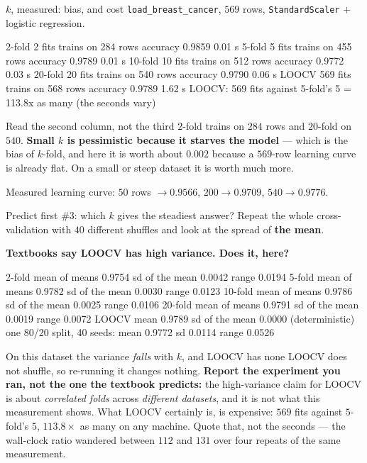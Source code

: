 \documentclass[aspectratio=169]{beamer}
\begin{document}
\begin{frame}[fragile,shrink=8]{$k$, measured: bias, and cost}
\texttt{load\_breast\_cancer}, $569$ rows, \texttt{StandardScaler} $+$
logistic regression.
\begin{outblk}
   2-fold      2 fits   trains on 284 rows   accuracy 0.9859     0.01 s
   5-fold      5 fits   trains on 455 rows   accuracy 0.9789     0.01 s
   10-fold    10 fits   trains on 512 rows   accuracy 0.9772     0.03 s
   20-fold    20 fits   trains on 540 rows   accuracy 0.9790     0.06 s
   LOOCV     569 fits   trains on 568 rows   accuracy 0.9789     1.62 s
   LOOCV: 569 fits against 5-fold's 5 = 113.8x as many (the seconds vary)
\end{outblk}
\begin{alertblock}{Read the second column, not the third}
  \footnotesize $2$-fold trains on $284$ rows and $20$-fold on $540$.
  \textbf{Small $k$ is pessimistic because it starves the model} --- which is
  the bias of $k$-fold, and here it is worth about $0.002$ because a
  $569$-row learning curve is already flat. On a small or steep dataset it is
  worth much more.
\end{alertblock}
\begin{center}\small
  Measured learning curve: $50$ rows $\to 0.9566$, $200 \to 0.9709$,
  $540 \to 0.9776$.
\end{center}
\end{frame}

\begin{frame}[fragile,shrink=8]{Predict first \#3: which $k$ gives the steadiest answer?}
Repeat the whole cross-validation with $40$ different shuffles and look at the
spread of \textbf{the mean}.

\begin{center}
  \textbf{Textbooks say LOOCV has high variance. Does it, here?}
\end{center}
\begin{outblk}
    2-fold   mean of means 0.9754   sd of the mean 0.0042   range 0.0194
    5-fold   mean of means 0.9782   sd of the mean 0.0030   range 0.0123
   10-fold   mean of means 0.9786   sd of the mean 0.0025   range 0.0106
   20-fold   mean of means 0.9791   sd of the mean 0.0019   range 0.0072
   LOOCV     mean          0.9789   sd of the mean 0.0000   (deterministic)
   one 80/20 split, 40 seeds: mean 0.9772  sd 0.0114  range 0.0526
\end{outblk}
\begin{alertblock}{On this dataset the variance \emph{falls} with $k$, and
  LOOCV has none}
  \footnotesize LOOCV does not shuffle, so re-running it changes nothing.
  \textbf{Report the experiment you ran, not the one the textbook predicts:}
  the high-variance claim for LOOCV is about \emph{correlated folds} across
  \emph{different datasets}, and it is not what this measurement shows. What
  LOOCV certainly is, is expensive: $569$ fits against $5$-fold's $5$,
  $113.8\times$ as many on any machine. Quote that, not the seconds --- the
  wall-clock ratio wandered between $112$ and $131$ over four repeats of the
  same measurement.
\end{alertblock}
\end{frame}
\end{document}
